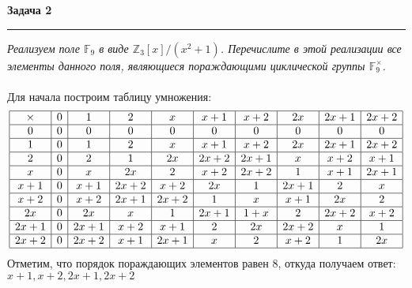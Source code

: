 \documentclass[a4paper,11pt]{article}
\newcommand{\F}{\mathbb{F}}
\newcommand{\Z}{\mathbb{Z}}
\begin{document}
\textbf{\large Задача 2}
\medskip\hrule\medskip
\textit{Реализуем поле $ \F_9 $ в виде $ \Z_3[x]/(x^2 + 1) $. Перечислите в этой реализации все элементы данного поля, являющиеся пораждающими циклической группы $ \F_9^{\times} $.  } \\ \\
Для начала построим таблицу умножения:
\begin{gather*}
	\begin{array}{|c|c|c|c|c|c|c|c|c|c|}
	\hline
	\times	& 0 & 1 & 2 & x & x + 1 & x + 2 & 2x & 2x + 1 & 2x + 2\\
	\hline
	0		& 0 & 0 & 0 & 0 & 0 & 0 & 0 & 0 & 0\\
	\hline
	1		& 0 & 1 & 2 & x & x + 1 & x + 2 & 2x & 2x + 1 & 2x + 2\\
	\hline
	2		& 0 & 2 & 1 & 2x & 2x + 2 & 2x + 1 & x & x + 2 & x + 1\\
	\hline
	x		& 0 & x & 2x & 2 & x + 2 & 2x + 2 & 1 & x + 1 & 2x + 1\\
	\hline
	x + 1	& 0 & x + 1 & 2x + 2 & x + 2 & 2x & 1 & 2x + 1 & 2 & x\\
	\hline
	x + 2	& 0 & x + 2 & 2x + 1 & 2x + 2 & 1 & x & x + 1 & 2x & 2\\
	\hline
	2x		& 0 & 2x & x & 1 & 2x + 1 & 1 + x & 2 & 2x + 2 & x + 2\\
	\hline
	2x + 1	& 0 & 2x + 1 & x + 2 & x + 1 & 2 & 2x & 2x + 2 & x & 1\\
	\hline
	2x + 2	& 0 & 2x + 2 & x + 1 & 2x + 1 & x & 2 & x + 2 & 1 & 2x\\
	\hline
	\end{array}
\end{gather*}
Отметим, что порядок пораждающих элементов равен 8, откуда получаем ответ: \\ $x + 1, x + 2, 2x + 1, 2x + 2$ 
\\ \\ \\
\end{document}
